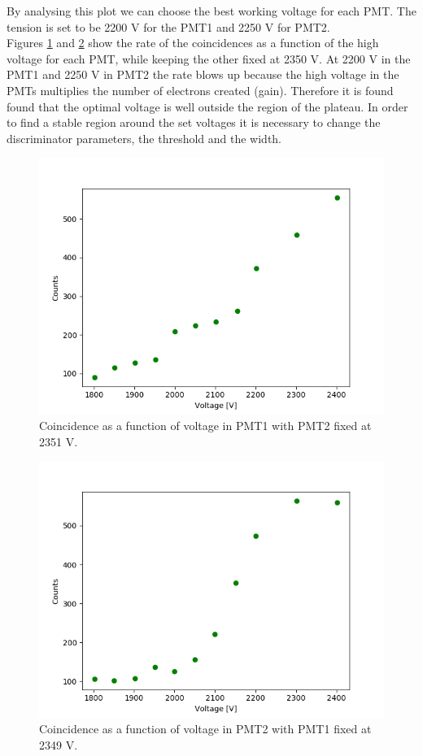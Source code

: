 \documentclass[10pt,swedish, openany]{book}
\begin{document}
By analysing this plot we can choose the best working voltage for each PMT. The tension is set to be 2200 V for the PMT1 and 2250 V for PMT2.\\

Figures \ref{fig:coin1} and \ref{fig:coin2} show the rate of the coincidences as a function of the high voltage for each PMT, while keeping the other fixed at 2350 V. At 2200 V in the PMT1 and 2250 V in PMT2 the rate blows up because the high voltage in the PMTs multiplies the number of electrons created (gain). Therefore it is found found that the optimal voltage is well outside the region of the plateau. In order to find a stable region around the set voltages it is necessary to change the discriminator parameters, the threshold and the width.

\begin{figure}[H]
\includegraphics[scale=0.6]{CoincidencePMT1.png}
\centering
\caption{Coincidence as a function of voltage in PMT1 with PMT2 fixed at 2351 V.}
\label{fig:coin1}
\end{figure}

\begin{figure}[H]
\includegraphics[scale=0.6]{CoincidencePMT2.png}
\centering
\caption{Coincidence as a function of voltage in PMT2 with PMT1 fixed at 2349 V.}
\label{fig:coin2}
\end{figure}
\end{document}
